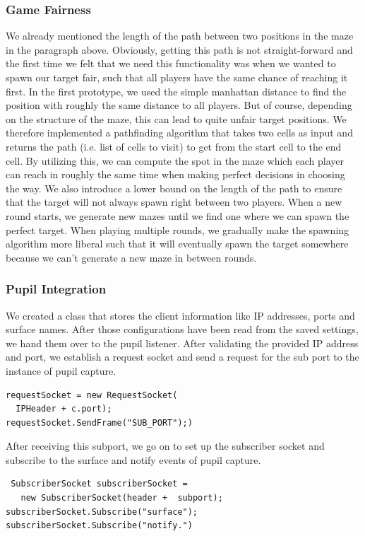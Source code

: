 \documentclass{sigchi}
\begin{document}
\subsubsection{Game Fairness}
We already mentioned the length of the path between two positions in the maze in the paragraph above. Obviously, getting this path is not straight-forward and the first time we felt that we need this functionality was when we wanted to spawn our target fair, such that all players have the same chance of reaching it first. In the first prototype, we used the simple manhattan distance to find the position with roughly the same distance to all players. But of course, depending on the structure of the maze, this can lead to quite unfair target positions. We therefore implemented a pathfinding algorithm that takes two cells as input and returns the path (i.e. list of cells to visit) to get from the start cell to the end cell. By utilizing this, we can compute the spot in the maze which each player can reach in roughly the same time when making perfect decisions in choosing the way. We also introduce a lower bound on the length of the path to ensure that the target will not always spawn right between two players. When a new round starts, we generate new mazes until we find one where we can spawn the perfect target. When playing multiple rounds, we gradually make the spawning algorithm more liberal such that it will eventually spawn the target somewhere because we can't generate a new maze in between rounds.

\subsubsection{Pupil Integration}
We created a class that stores the client information like IP addresses, ports and surface names. After those configurations have been read from the saved settings, we hand them over to the pupil listener. After validating the provided IP address and port, we establish a request socket and send a request for the sub port to the instance of pupil capture. 
\begin{verbatim}
requestSocket = new RequestSocket(
  IPHeader + c.port); 
requestSocket.SendFrame("SUB_PORT");)
\end{verbatim}

 After receiving this subport, we go on to set up the subscriber socket and subscribe to the surface and notify events of pupil capture. 
  \begin{verbatim}
 SubscriberSocket subscriberSocket = 
   new SubscriberSocket(header +  subport); 
subscriberSocket.Subscribe("surface");
subscriberSocket.Subscribe("notify.")
\end{verbatim}
 
\end{document}
